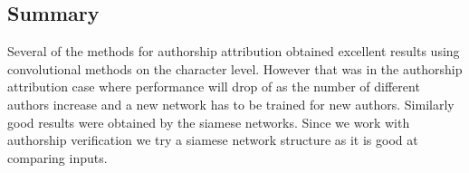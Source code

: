 \subsection{Summary}

Several of the methods for authorship attribution obtained excellent results
using convolutional methods on the character level. However that was in the
authorship attribution case where performance will drop of as the number of
different authors increase and a new network has to be trained for new authors.
Similarly good results were obtained by the siamese networks. Since we work with
authorship verification we try a siamese network structure as it is good at
comparing inputs.
